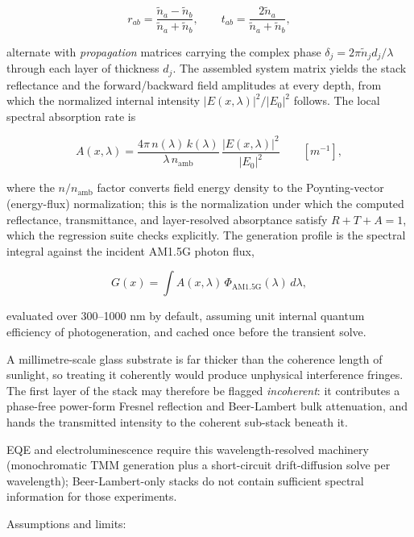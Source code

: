 \documentclass[
  11pt,
  american,
]{report}
\begin{document}
\[
r_{ab} = \frac{\tilde n_a - \tilde n_b}{\tilde n_a + \tilde n_b},
\qquad
t_{ab} = \frac{2\tilde n_a}{\tilde n_a + \tilde n_b},
\]

alternate with \emph{propagation} matrices carrying the complex phase
\(\delta_j = 2\pi \tilde n_j d_j/\lambda\) through each layer of
thickness \(d_j\). The assembled system matrix yields the stack
reflectance and the forward/backward field amplitudes at every depth,
from which the normalized internal intensity
\(|E(x,\lambda)|^2/|E_0|^2\) follows. The local spectral absorption rate
is

\begin{equation}
\label{eq:tmm-absorption}
A(x,\lambda)
=
\frac{4\pi\, n(\lambda)\, k(\lambda)}{\lambda\, n_\mathrm{amb}}
\,\frac{|E(x,\lambda)|^2}{|E_0|^2}
\qquad [m^{-1}],
\end{equation}

where the \(n/n_\mathrm{amb}\) factor converts field energy density to
the Poynting-vector (energy-flux) normalization; this is the
normalization under which the computed reflectance, transmittance, and
layer-resolved absorptance satisfy \(R+T+A=1\), which the regression
suite checks explicitly. The generation profile is the spectral integral
against the incident AM1.5G photon flux,

\begin{equation}
\label{eq:tmm-generation}
G(x)
=
\int A(x,\lambda)\,\Phi_\mathrm{AM1.5G}(\lambda)\,d\lambda ,
\end{equation}

evaluated over 300--1000 nm by default, assuming unit internal quantum
efficiency of photogeneration, and cached once before the transient
solve.

A millimetre-scale glass substrate is far thicker than the coherence
length of sunlight, so treating it coherently would produce unphysical
interference fringes. The first layer of the stack may therefore be
flagged \emph{incoherent}: it contributes a phase-free power-form
Fresnel reflection and Beer-Lambert bulk attenuation, and hands the
transmitted intensity to the coherent sub-stack beneath it.

EQE and electroluminescence require this wavelength-resolved machinery
(monochromatic TMM generation plus a short-circuit drift-diffusion solve
per wavelength); Beer-Lambert-only stacks do not contain sufficient
spectral information for those experiments.

Assumptions and limits:
\end{document}
